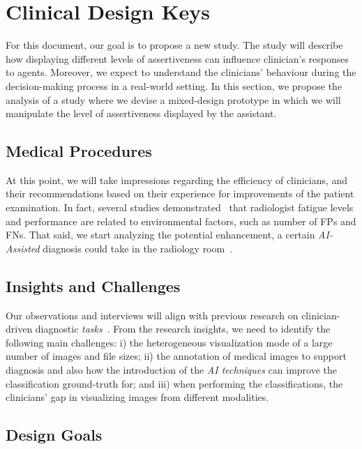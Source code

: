 \section{Clinical Design Keys}
\label{sec:sec003}

For this document, our goal is to propose a new study.
The study will describe how displaying different levels of assertiveness can influence clinician's responses to agents.
Moreover, we expect to understand the clinicians' behaviour during the decision-making process in a real-world setting.
In this section, we propose the analysis of a study where we devise a mixed-design prototype in which we will manipulate the level of assertiveness displayed by the assistant.

\subsection{Medical Procedures}
\label{sec:sec00301}

At this point, we will take impressions regarding the efficiency of clinicians, and their recommendations based on their experience for improvements of the patient examination.
In fact, several studies demonstrated~\cite{waite2017tired} that radiologist fatigue levels and performance are related to environmental factors, such as number of FPs and FNs.
That said, we start analyzing the potential enhancement, a certain {\it AI-Assisted} diagnosis could take in the radiology room~\cite{chatelain2018evaluation, miglioretti2007radiologist}.

\subsection{Insights and Challenges}
\label{sec:sec00302}

Our observations and interviews will align with previous research on clinician-driven diagnostic {\it tasks}~\cite{Sultanum:2018:MTP:3173574.3173996}.
From the research insights, we need to identify the following main challenges:
i) the heterogeneous visualization mode of a large number of images and file sizes;
ii) the annotation of medical images to support diagnosis and also 
how the introduction of the {\it AI techniques} can improve the classification ground-truth for; and
iii) when performing the classifications, the clinicians' gap in visualizing images from different modalities.

\subsection{Design Goals}
\label{sec:sec00303}

